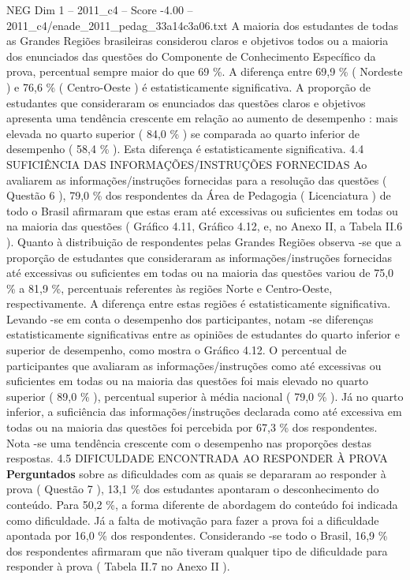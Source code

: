 \begin{textsample}{NEG Dim 1 – 2011\_c4 – Score -4.00 – 2011\_c4/enade\_2011\_pedag\_33a14c3a06.txt}
A maioria dos estudantes de todas as Grandes Regiões brasileiras considerou claros e objetivos todos ou a maioria dos enunciados das questões do Componente de Conhecimento Específico da prova, percentual sempre maior do que 69 \%.
A diferença entre 69,9 \% ( Nordeste ) e 76,6 \% ( Centro-Oeste ) é estatisticamente significativa.
A proporção de estudantes que consideraram os enunciados das questões claros e objetivos apresenta uma tendência crescente em relação ao aumento de desempenho : mais elevada no quarto superior ( 84,0 \% ) se comparada ao quarto inferior de desempenho ( 58,4 \% ).
Esta diferença é estatisticamente significativa. 4.4 SUFICIÊNCIA DAS INFORMAÇÕES/INSTRUÇÕES FORNECIDAS Ao avaliarem as informações/instruções fornecidas para a resolução das questões ( Questão 6 ), 79,0 \% dos respondentes da Área de Pedagogia ( Licenciatura ) de todo o Brasil afirmaram que estas eram até excessivas ou suficientes em todas ou na maioria das questões ( Gráfico 4.11, Gráfico 4.12, e, no Anexo II, a Tabela II.6 ).
Quanto à distribuição de respondentes pelas Grandes Regiões observa -se que a proporção de estudantes que consideraram as informações/instruções fornecidas até excessivas ou suficientes em todas ou na maioria das questões variou de 75,0 \% a 81,9 \%, percentuais referentes às regiões Norte e Centro-Oeste, respectivamente.
A diferença entre estas regiões é estatisticamente significativa.
Levando -se em conta o desempenho dos participantes, notam -se diferenças estatisticamente significativas entre as opiniões de estudantes do quarto inferior e superior de desempenho, como mostra o Gráfico 4.12.
O percentual de participantes que avaliaram as informações/instruções como até excessivas ou suficientes em todas ou na maioria das questões foi mais elevado no quarto superior ( 89,0 \% ), percentual superior à média nacional ( 79,0 \% ).
Já no quarto inferior, a suficiência das informações/instruções declarada como até excessiva em todas ou na maioria das questões foi percebida por 67,3 \% dos respondentes.
Nota -se uma tendência crescente com o desempenho nas proporções destas respostas. 4.5 DIFICULDADE ENCONTRADA AO RESPONDER À PROVA \textbf{Perguntados} sobre as dificuldades com as quais se depararam ao responder à prova ( Questão 7 ), 13,1 \% dos estudantes apontaram o desconhecimento do conteúdo.
Para 50,2 \%, a forma diferente de abordagem do conteúdo foi indicada como dificuldade.
Já a falta de motivação para fazer a prova foi a dificuldade apontada por 16,0 \% dos respondentes.
Considerando -se todo o Brasil, 16,9 \% dos respondentes afirmaram que não tiveram qualquer tipo de dificuldade para responder à prova ( Tabela II.7 no Anexo II ).

\end{textsample}
